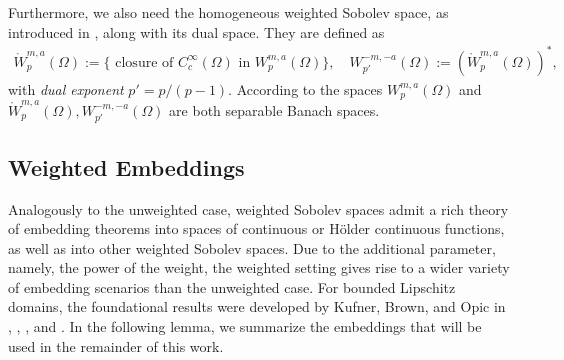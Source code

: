 \documentclass[12pt,a4paper,twoside]{article}
\begin{document}
Furthermore, we also need the homogeneous weighted Sobolev space, as introduced in \cite[Subsection 6.1]{maz2010dirichlet}, along with its dual space. They are defined as
\begin{align}
   \mathring{W}_p^{m,a}(\Omega):= \big\{ \text{ closure of $C^\infty_c(\Omega)$ in } W^{m,a}_p(\Omega) \big\}, 
   \quad
   W^{-m, -a}_{p'}(\Omega):= \left( \mathring{W}_p^{m,a}(\Omega) \right)^{*}, \label{eq:wwdual}
\end{align}
with \emph{dual exponent} $p'=p/(p-1)$. According to \cite[p.18 Theorem 3.6]{kufner1980weighted} the spaces $W^{m,a}_p(\Omega)$ and $\mathring{W}_p^{m,a}(\Omega),W^{-m, -a}_{p'}(\Omega)$ are both separable Banach spaces. 

\subsection{Weighted Embeddings}
\label{subsec:weightedemb}
Analogously to the unweighted case, weighted Sobolev spaces admit a rich theory of embedding theorems into spaces of continuous or Hölder continuous functions, as well as into other weighted Sobolev spaces. Due to the additional parameter, namely, the power of the weight, the weighted setting gives rise to a wider variety of embedding scenarios than the unweighted case. For bounded Lipschitz domains, the foundational results were developed by Kufner, Brown, and Opic in \cite{kufner1980weighted}, \cite{opic1990hardy}, \cite{brown1992embeddings}, and \cite{brown1998some}. In the following lemma, we summarize the embeddings that will be used in the remainder of this work.
\end{document}
